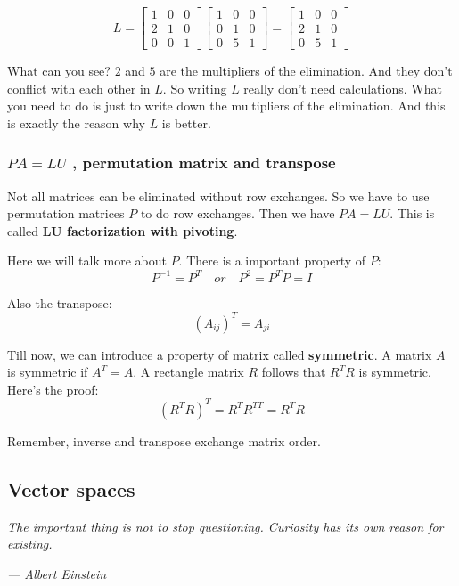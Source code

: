 \documentclass[12pt]{ctexart}
\begin{document}
\[
  L = \begin{bmatrix}
    1 & 0 & 0 \\
    2 & 1 & 0 \\
    0 & 0 & 1
  \end{bmatrix}
  \begin{bmatrix}
    1 & 0 & 0 \\
    0 & 1 & 0 \\
    0 & 5 & 1
  \end{bmatrix}
  =
  \begin{bmatrix}
    1 & 0 & 0 \\
    2 & 1 & 0 \\
    0 & 5 & 1
  \end{bmatrix}
\]

What can you see? $2$ and $5$ are the multipliers of the elimination. And they don't
conflict with each other in $L$. So writing $L$ really don't need calculations. What
you need to do is just to write down the multipliers of the elimination. And this is
exactly the reason why $L$ is better.

\subsubsection{$PA = LU$ \textbf{, permutation matrix and transpose}}

Not all matrices can be eliminated without row exchanges. So we have to use permutation
matrices $P$ to do row exchanges. Then we have $PA = LU$. This is called \textbf{LU
factorization with pivoting}.

Here we will talk more about $P$. There is a important property of $P$:
\[
  P^{-1} = P^{T} \quad or \quad P^{2} = P^{T}P = I
\]

Also the transpose:
\[
  (A_{ij})^{T} = A_{ji}
\]

Till now, we can introduce a property of matrix called \textbf{symmetric}. A matrix $A$
is symmetric if $A^{T} = A$. A rectangle matrix $R$ follows that $R^{T}R$ is symmetric.
Here's the proof:
\[
  (R^{T}R)^{T} = R^{T}R^{TT} = R^{T}R
\]

Remember, inverse and transpose exchange matrix order.

\newpage
\thispagestyle{empty}
\begin{center}
    \vspace*{96pt}
    \fontsize{60}{60}\par
    \fontsize{26}{31.2}\section{\textbf{Vector spaces}}\par %
    \vspace{25pt}
    \begin{center}
      \fontsize{18}{21.6}\customfont\textit{The important thing is not to stop
    questioning. Curiosity has its own reason for existing.}
    \end{center}
    \begin{flushright}
      \fontsize{18}{21.6}\customfont\textit{--- Albert Einstein}
    \end{flushright}
    \vfill
\end{center}
\end{document}
